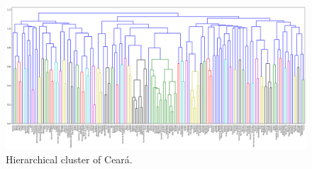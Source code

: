\documentclass[12pt]{report}
\begin{document}
\begin{figure}[h!]
 \centering
 \includegraphics[width=\textwidth]{clusterCE_06.png}
 \caption{Hierarchical cluster of Ceará.}
 \label{fig:cluster_ce}
\end{figure}
\end{document}
